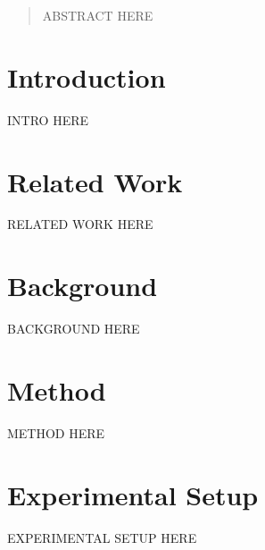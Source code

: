 \documentclass{article}
\theoremstyle{plain}
\theoremstyle{definition}
\theoremstyle{remark}
\begin{document}

\printAffiliationsAndNotice{}  %

\begin{abstract}
ABSTRACT HERE
\end{abstract}

\section{Introduction}
\label{sec:intro}
INTRO HERE

\section{Related Work}
\label{sec:related}
RELATED WORK HERE

\section{Background}
\label{sec:background}
BACKGROUND HERE

\section{Method}
\label{sec:method}
METHOD HERE

\section{Experimental Setup}
\label{sec:experimental_setup}
EXPERIMENTAL SETUP HERE
\end{document}
